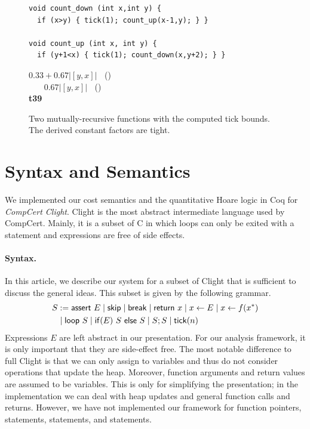 \documentclass[nocopyrightspace,preprint,pldi]{sigplanconf-pldi15}
\newcommand{\ifshort}[2]{\ifx\fullversion\undefined{#1}\else{#2}\fi}
\newcommand{\sectskip}[0]{\ifshort{\vspace{-3pt}}{}}
\newcommand{\aftersectskip}[0]{\ifshort{\vspace{-1pt}}{}}
\begin{document}
\begin{figure}[t]
  \centering
    \begin{minipage}[b]{\linewidth}
    \begin{center}
   \begin{lstlisting}
void count_down (int x,int y) {
  if (x>y) { tick(1); count_up(x-1,y); } }

void count_up (int x, int y) {
  if (y+1<x) { tick(1); count_down(x,y+2); } }

   \end{lstlisting}

$0.33 + 0.67 |[y,x]|\;\;$ ()\\
$\;\;\;\;\;\;\,0.67 |[y,x]|\;\;$ ()
\\[.4\baselineskip]
      {\bf t39}
    \end{center}
  \end{minipage}
\vspace{-1.5ex}

  \caption{Two mutually-recursive functions with the computed tick bounds.  The derived constant factors are tight.}
  \label{fig:ex_rec}
\end{figure}


\sectskip
\section{Syntax and Semantics}
\label{sec:sem}
\aftersectskip

We implemented our cost semantics and the quantitative Hoare logic in
Coq for \emph{CompCert Clight}.  Clight is the most abstract
intermediate language used by CompCert.  Mainly, it is a subset of C
in which loops can only be exited with a  statement and
expressions are free of side effects.

\paragraph{Syntax.}

In this article, we describe our system for a subset of Clight that is
sufficient to discuss the general ideas.  This subset is given by the
following grammar.
%
\begin{align*}
S &:= \mathsf{assert}~E
\mid \mathsf{skip}
\mid \mathsf{break}
\mid \mathsf{return}~x
\mid x \gets E
\mid x \gets f(x^*)
\\
& \mid \mathsf{loop}~S
\mid \mathsf{if}(E)~S~\mathsf{else}~S
\mid S;S
\mid \mathsf{tick}(n)
\end{align*}
%
Expressions $E$ are left abstract in our presentation.  For our
analysis framework, it is only important that they are side-effect
free.
%
The most notable difference to full Clight is that we can only assign
to variables and thus do not consider operations that update the heap.
Moreover, function arguments and return values are assumed to be
variables.  This is only for simplifying the presentation; in the
implementation we can deal with heap updates and general function
calls and returns.  However, we have not implemented our framework for function
pointers,  statements,  statements, and
 statements.
\end{document}
